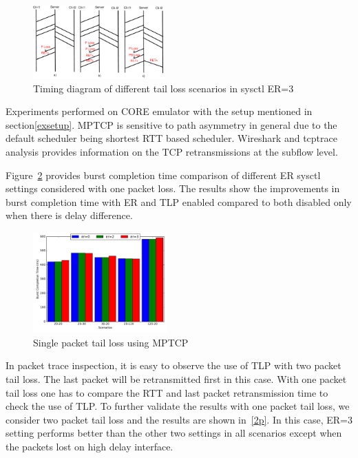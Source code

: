 \documentclass[10pt,draftcls,twocolumn]{IEEEconf}
\begin{document}
\begin{figure}[!ht]
\begin{center}
\includegraphics[angle=0, width=0.45\textwidth, natwidth=610, natheight=400]{images/timingER3.pdf}
\end{center}
\caption{Timing diagram of different tail loss scenarios in sysctl ER=3}\label{timingER3}
\end{figure}



Experiments performed on CORE emulator with the setup mentioned in section\ref{exsetup}.
MPTCP is sensitive to path asymmetry in general due to the default scheduler being shortest RTT based scheduler. Wireshark and tcptrace
analysis provides information on the TCP retransmissions at the subflow level.  


Figure~\ref{1p} provides burst completion time comparison of different ER sysctl settings considered with one packet loss. The results show the improvements
in burst completion time with ER and TLP enabled compared to both disabled only when there is delay difference.

\begin{figure}[!ht]
\begin{center}
\includegraphics[angle=0, width=0.46\textwidth,natwidth=578.16,natheight=433.62]{plots/1P.pdf}
\caption{Single packet tail loss using MPTCP}\label{1p}
\end{center}
\end{figure}

In packet trace inspection, it is easy to observe the use of TLP with two packet tail loss. The last packet will be retransmitted first in this case.
With one packet tail loss one has to compare the RTT and last packet retransmission time to check the use of TLP.
To further validate the results with one packet tail loss, we consider two packet tail loss and the results are shown in~\ref{2p}.
In this case, ER=3 setting performs better than the other two settings in all scenarios except when the packets lost on high delay interface. 
\end{document}
